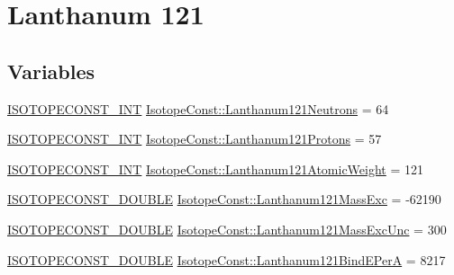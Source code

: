 \hypertarget{group___isotope_const-_lanthanum-_la121}{}\section{Lanthanum 121}
\label{group___isotope_const-_lanthanum-_la121}
\subsection*{Variables}
\begin{DoxyCompactItemize}
\item 
\mbox{\hyperlink{group___isotope_const-_macros_ga5f18360b3e99483a35c32d789e62621c}{I\+S\+O\+T\+O\+P\+E\+C\+O\+N\+S\+T\+\_\+\+I\+NT}} \mbox{\hyperlink{group___isotope_const-_lanthanum-_la121_ga39b68b9ba4e126e84f290405ec5ed2cc}{Isotope\+Const\+::\+Lanthanum121\+Neutrons}} = 64
\item 
\mbox{\hyperlink{group___isotope_const-_macros_ga5f18360b3e99483a35c32d789e62621c}{I\+S\+O\+T\+O\+P\+E\+C\+O\+N\+S\+T\+\_\+\+I\+NT}} \mbox{\hyperlink{group___isotope_const-_lanthanum-_la121_gafd8ff348bd9eb6afb91660a2743af6bd}{Isotope\+Const\+::\+Lanthanum121\+Protons}} = 57
\item 
\mbox{\hyperlink{group___isotope_const-_macros_ga5f18360b3e99483a35c32d789e62621c}{I\+S\+O\+T\+O\+P\+E\+C\+O\+N\+S\+T\+\_\+\+I\+NT}} \mbox{\hyperlink{group___isotope_const-_lanthanum-_la121_ga6073538565a2f0c3d337176f157a3354}{Isotope\+Const\+::\+Lanthanum121\+Atomic\+Weight}} = 121
\item 
\mbox{\hyperlink{group___isotope_const-_macros_ga8f45a7272ce02c0b4c65c44636ed719a}{I\+S\+O\+T\+O\+P\+E\+C\+O\+N\+S\+T\+\_\+\+D\+O\+U\+B\+LE}} \mbox{\hyperlink{group___isotope_const-_lanthanum-_la121_ga52923f8578c686170efe9ca7caf08cfd}{Isotope\+Const\+::\+Lanthanum121\+Mass\+Exc}} = -\/62190
\item 
\mbox{\hyperlink{group___isotope_const-_macros_ga8f45a7272ce02c0b4c65c44636ed719a}{I\+S\+O\+T\+O\+P\+E\+C\+O\+N\+S\+T\+\_\+\+D\+O\+U\+B\+LE}} \mbox{\hyperlink{group___isotope_const-_lanthanum-_la121_ga23b173098d3d03f8747db43f21c887b8}{Isotope\+Const\+::\+Lanthanum121\+Mass\+Exc\+Unc}} = 300
\item 
\mbox{\hyperlink{group___isotope_const-_macros_ga8f45a7272ce02c0b4c65c44636ed719a}{I\+S\+O\+T\+O\+P\+E\+C\+O\+N\+S\+T\+\_\+\+D\+O\+U\+B\+LE}} \mbox{\hyperlink{group___isotope_const-_lanthanum-_la121_ga3a7640dca12cb66bac75454f232088c0}{Isotope\+Const\+::\+Lanthanum121\+Bind\+E\+PerA}} = 8217
\item 

\end{DoxyCompactItemize}
